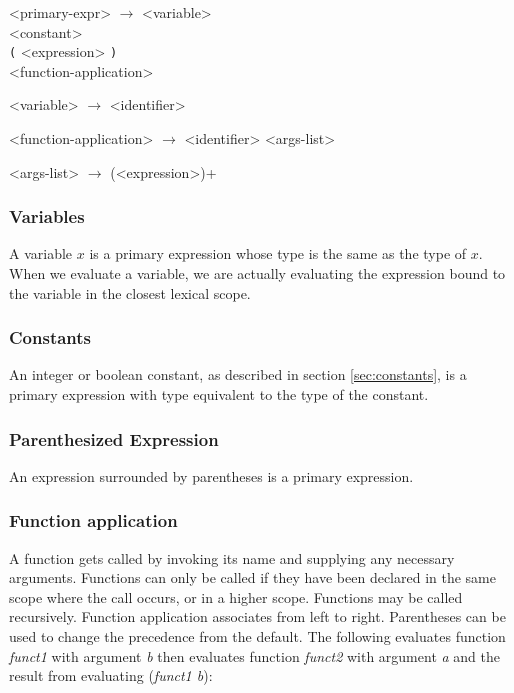 \setlength{\grammarindent}{7.5em}
\begin{grammar}
<primary-expr> $\rightarrow$ <variable> \\ <constant> \\ \texttt{(} <expression> \texttt{)} \\
														<function-application> 

<variable> $\rightarrow$ <identifier> 

<function-application> $\rightarrow$ <identifier> <args-list> 

<args-list> $\rightarrow$ (<expression>)+

\end{grammar}

\subsubsection{Variables}
A variable $x$ is a primary expression whose type is the same as the type of $x$.
When we evaluate a variable, we are actually evaluating
the expression bound to the variable in the closest lexical scope.

\subsubsection{Constants}
An integer or boolean constant, as described in section \ref{sec:constants}, is a primary expression
with type equivalent to the type of the constant.

\subsubsection{Parenthesized Expression}
An expression surrounded by parentheses is a primary expression.

\subsubsection{Function application}
A function gets called by invoking its name and supplying any necessary arguments. 
Functions can only be called if they have been declared in the same scope where the call occurs,
or in a higher scope. Functions may be called recursively. Function application associates 
from left to right. Parentheses can be used to change the precedence from the default.
The following evaluates function \emph{funct1} with argument \emph{b} then evaluates function
\emph{funct2} with argument \emph{a} and the result from evaluating (\emph{funct1 b}): \\
    

